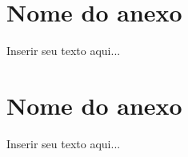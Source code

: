 %
%

\anexo
\chapter{Nome do anexo}
\label{chap:anexox}

Inserir seu texto aqui...

\chapter{Nome do anexo}
\label{chap:anexoy}

Inserir seu texto aqui...
